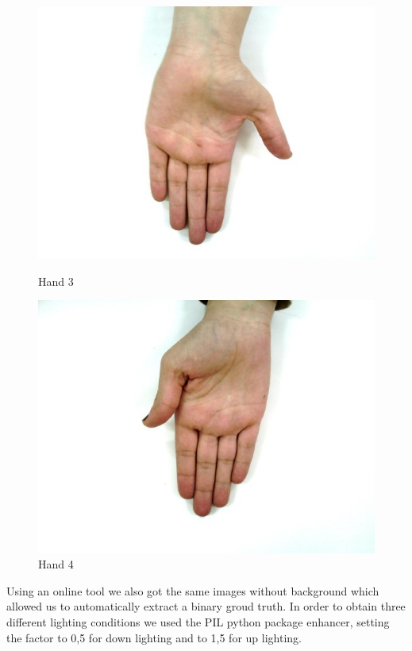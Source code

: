 \documentclass{report}
\begin{document}
\begin{figure}[H]
    \includegraphics[width=\linewidth]{Images/hand3.png}
    \caption{Hand 3}
  \endminipage\hfill
    \includegraphics[width=\linewidth]{Images/hand4.png}
    \caption{Hand 4}
  \endminipage\hfill
\end{figure}
Using an online tool we also got the same images without 
background which allowed us to automatically extract a binary groud truth.
In order to obtain three different lighting conditions we used the PIL python package enhancer,
setting the factor to 0,5 for down lighting and to 1,5 for up lighting. 
\end{document}
